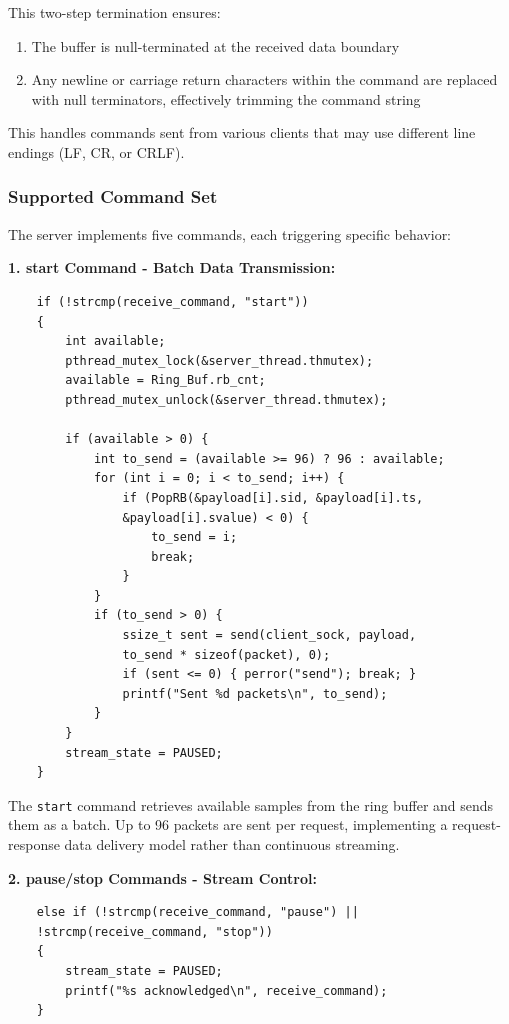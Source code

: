 This two-step termination ensures:
\begin{enumerate}
	\item The buffer is null-terminated at the received data boundary
	\item Any newline or carriage return characters within the command are replaced with null terminators, effectively trimming the command string
\end{enumerate}

This handles commands sent from various clients that may use different line endings (LF, CR, or CRLF).

\subsubsection{Supported Command Set}

The server implements five commands, each triggering specific behavior:

\textbf{1. start Command - Batch Data Transmission:}

\begin{verbatim}
	if (!strcmp(receive_command, "start"))
	{
		int available;
		pthread_mutex_lock(&server_thread.thmutex);
		available = Ring_Buf.rb_cnt;
		pthread_mutex_unlock(&server_thread.thmutex);
		
		if (available > 0) {
			int to_send = (available >= 96) ? 96 : available;
			for (int i = 0; i < to_send; i++) {
				if (PopRB(&payload[i].sid, &payload[i].ts,
				&payload[i].svalue) < 0) {
					to_send = i;
					break;
				}
			}
			if (to_send > 0) {
				ssize_t sent = send(client_sock, payload,
				to_send * sizeof(packet), 0);
				if (sent <= 0) { perror("send"); break; }
				printf("Sent %d packets\n", to_send);
			}
		}
		stream_state = PAUSED;
	}
\end{verbatim}

The \texttt{start} command retrieves available samples from the ring buffer and sends them as a batch. Up to 96 packets are sent per request, implementing a request-response data delivery model rather than continuous streaming.

\textbf{2. pause/stop Commands - Stream Control:}

\begin{verbatim}
	else if (!strcmp(receive_command, "pause") ||
	!strcmp(receive_command, "stop"))
	{
		stream_state = PAUSED;
		printf("%s acknowledged\n", receive_command);
	}
\end{verbatim}


